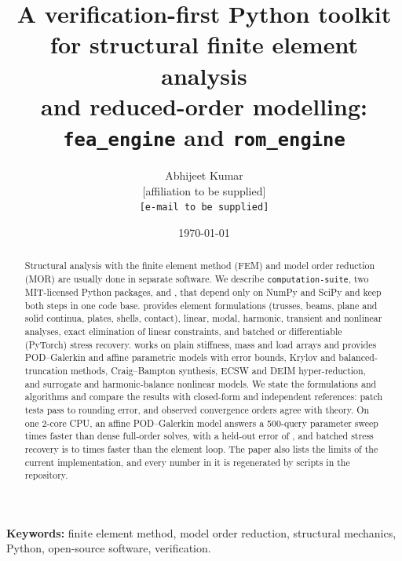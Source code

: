 \documentclass[11pt,a4paper]{article}
\title{A verification-first Python toolkit for structural finite element analysis\\
and reduced-order modelling: \texttt{fea\_engine} and \texttt{rom\_engine}}
\author{Abhijeet Kumar\\[2pt]
{\small [affiliation to be supplied]}\\
{\small \texttt{[e-mail to be supplied]}}}
\date{\today}
\begin{document}
\maketitle

\begin{abstract}
Structural analysis with the finite element method (FEM) and model order reduction (MOR) are usually done in separate software.
We describe \texttt{computation-suite}, two MIT-licensed Python packages, \fea{} and \rom{}, that depend only on NumPy and SciPy and keep both steps in one code base.
\fea{} provides \nElements{} element formulations (trusses, beams, plane and solid continua, plates, shells, contact), linear, modal, harmonic, transient and nonlinear analyses, exact elimination of linear constraints, and batched or differentiable (PyTorch) stress recovery.
\rom{} works on plain stiffness, mass and load arrays and provides POD--Galerkin and affine parametric models with error bounds, Krylov and balanced-truncation methods, Craig--Bampton synthesis, ECSW and DEIM hyper-reduction, and surrogate and harmonic-balance nonlinear models.
We state the formulations and algorithms and compare the results with closed-form and independent references: patch tests pass to rounding error, and observed convergence orders agree with theory.
On one 2-core CPU, an affine POD--Galerkin model answers a 500-query parameter sweep \eOneSpeedup{} times faster than dense full-order solves, with a held-out error of \eOneErr{}, and batched stress recovery is \recoveryMinSpeedup{} to \recoveryMaxSpeedup{} times faster than the element loop.
The paper also lists the limits of the current implementation, and every number in it is regenerated by scripts in the repository.
\end{abstract}

\noindent\textbf{Keywords:} finite element method, model order reduction, structural mechanics, Python, open-source software,
verification.




















\end{document}
